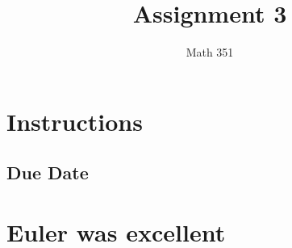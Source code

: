 \documentclass{article}
\title{Assignment 3}
\author{Math 351}
\date{}
\begin{document}
\maketitle

\tableofcontents
\section{Instructions}
\subsection{Due Date}
\section{Euler was excellent}
\end{document}

